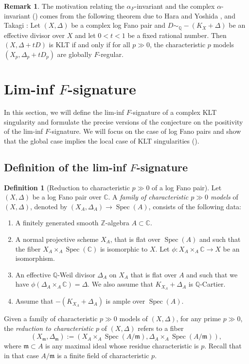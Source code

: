 \documentclass[11pt,reqno]{amsart}
\newcommand{\C}{\mathbb{C}}
\newcommand{\Q}{\mathbb{Q}}
\newcommand{\Z}{\mathbb{Z}}
\newcommand{\fm}{\mathfrak{m}}
\DeclareMathOperator{\Spec}{Spec}
\numberwithin{equation}{section}
\theoremstyle{definition}
\newtheorem{rem}[prop] {Remark}
\newtheorem{defi}[prop] {Definition}
\newcommand{\FA}{\alpha_{F}}
\begin{document}
\begin{rem}
    The motivation relating the $\FA$-invariant and the complex $\alpha$-invariant () comes from the following theorem due to Hara and Yoshida \cite{HaraYoshidaGeneralizationOfTightClosure}, and Takagi \cite{TakagiInterpretationOfMultiplierIdeals}: Let $(X, \Delta)$ be a complex log Fano pair and $D \sim _\Q -(K_X + \Delta)$ be an effective divisor over $X$ and let $0 < t < 1$ be a fixed rational number. Then $(X, \Delta + tD)$ is KLT if and only if for all $p \gg 0$, the characteristic $p$ models $(X_p, \Delta_p + t D_p)$ are globally $F$-regular.
\end{rem}


\section{Lim-inf $F$-signature}

In this section, we will define the lim-inf $F$-signature of a complex KLT singularity and formulate the precise versions of the conjecture on the positivity of the lim-inf $F$-signature. We will focus on the case of log Fano pairs and show that the global case implies the local case of KLT singularities ().

\subsection{Definition of the lim-inf $F$-signature}
\begin{defi}[Reduction to characteristic $p \gg 0$ of a log Fano pair] \label{reductindfn}
    Let $(X, \Delta)$ be a log Fano pair over $\C$. A \emph{family of characteristic $p \gg 0$ models} of $(X, \Delta)$, denoted by $(X_A, \Delta_A) \to \Spec(A)$, consists of the following data:
    \begin{enumerate}
        \item A finitely generated smooth $\Z$-algebra $A \subset \C$.
        \item A normal projective scheme $X_A$, that is flat over $\Spec(A)$ and such that the fiber $X_A \times_{A} \Spec(\C) $ is  isomorphic to $X$. Let $\phi: X_A \times_A \C \to X$ be an isomorphism.
        \item An effective $\Q$-Weil divisor $\Delta_A$ on $X_A$ that is flat over $A$ and such that we have  $\phi(\Delta _A \times_A \C) = \Delta$. We also assume that $K_{X_A} + \Delta_{A}$ is $\Q$-Cartier.
        \item Assume that $-(K_{X_A} + \Delta_A)$ is ample over $\Spec(A)$.
    \end{enumerate}
    Given a family of characteristic $p \gg 0$ models of $(X, \Delta)$, for any prime $p \gg 0$, the \emph{reduction to characteristic $p$} of $(X, \Delta)$ refers to a fiber
    \[ (X_{\fm}, \Delta_\fm) :=  (X_A \times_A \Spec(A/\fm), \Delta_A \times_A \Spec(A/\fm) ),\] where $\fm \subset A$ is any maximal ideal whose residue characteristic is $p$. Recall that in that case $A/\fm$ is a finite field of characteristic $p$.
\end{defi}  
\end{document}

